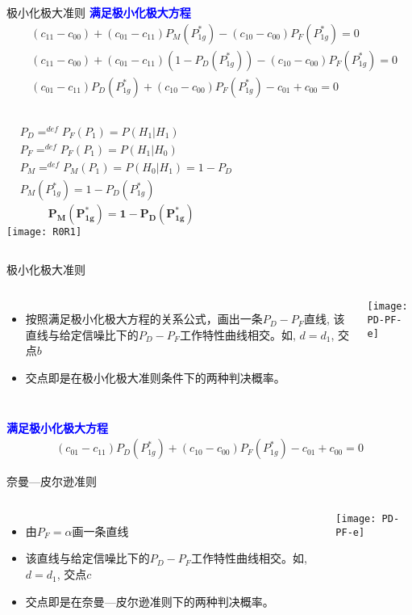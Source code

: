\begin{frame}[shrink]{极小化极大准则}
\textbf{\textcolor{blue}{满足极小化极大方程}}
\begin{align*}
&(c_{11}-c_{00})+(c_{01}-c_{11})P_M(P_{1g}^\ast)-(c_{10}-c_{00})P_F(P_{1g}^\ast)=0\\
&(c_{11}-c_{00})+(c_{01}-c_{11})\left(1-P_D(P_{1g}^\ast)\right)-(c_{10}-c_{00})P_F(P_{1g}^\ast)=0\\
&(c_{01}-c_{11})P_D(P_{1g}^\ast)+(c_{10}-c_{00})P_F(P_{1g}^\ast)-c_{01}+c_{00}=0
\end{align*}
\begin{columns}[T]
	\begin{align*}
	&P_D \mathop{=}^{def}P_F(P_1)=P(H_1|H_1)\\
	&P_F \mathop{=}^{def}P_F(P_1)=P(H_1|H_0)\\
	&P_M \mathop{=}^{def}P_M(P_1)=P(H_0|H_1)=1-P_D\\
	&P_M(P_{1g}^\ast)=1-P_D(P_{1g}^\ast)
	\end{align*}
	\[\bm{P_M(P_{1g}^\ast)=1-P_D(P_{1g}^\ast)} \]
	\texttt{[image: R0R1]}
\end{columns}
\end{frame}

\begin{frame}[shrink]{极小化极大准则}
\begin{columns}[T]
	\begin{itemize}
		\item 按照满足极小化极大方程的关系公式，画出一条$P_D-P_F$直线, 该直线与给定信噪比下的$P_D-P_F$工作特性曲线相交。如, $d=d_1$, 交点$b$
		\item 交点即是在极小化极大准则条件下的两种判决概率。
	\end{itemize}
	\texttt{[image: PD-PF-e]}
\end{columns}
\textbf{\textcolor{blue}{满足极小化极大方程}}
\begin{align*}
(c_{01}-c_{11})P_D(P_{1g}^\ast)+(c_{10}-c_{00})P_F(P_{1g}^\ast)-c_{01}+c_{00}=0
\end{align*}
\end{frame}

\begin{frame}[shrink]{奈曼---皮尔逊准则}
\begin{columns}[T]
	\begin{itemize}
		\item 由$P_F=\alpha$画一条直线
		\item 该直线与给定信噪比下的$P_D-P_F$工作特性曲线相交。如, $d=d_1$, 交点$c$
		\item 交点即是在奈曼---皮尔逊准则下的两种判决概率。
	\end{itemize}
	\texttt{[image: PD-PF-e]}
\end{columns}
\end{frame}